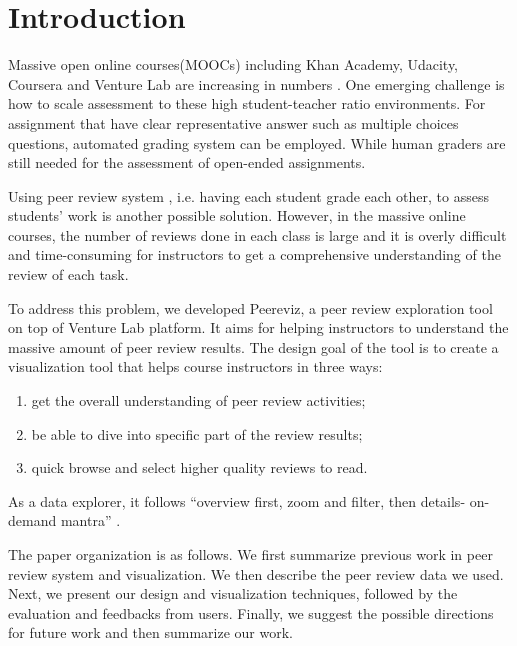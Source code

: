 \documentclass{sigchi}
\begin{document}
\section{Introduction}
Massive open online courses(MOOCs) including Khan Academy, Udacity, Coursera and
Venture Lab are increasing in numbers \cite{nytimes}. One emerging challenge is
how to scale assessment to these high student-teacher ratio environments.
For assignment that have clear representative answer
such as multiple choices questions,
automated grading system can be employed.
While human graders are still needed for the assessment of open-ended assignments.

Using peer review system \cite{cpr}, i.e. having each student grade each other,
to assess students’ work is another possible solution.
However, in the massive online courses, the number of reviews done in each class
is large and it is overly difficult
and time-consuming for instructors to get a comprehensive understanding
of the review of each task.

To address this problem, we developed Peereviz, a peer review exploration tool
on top of Venture Lab platform. It aims for helping instructors to understand
the massive amount of peer review results. The design goal of the tool is to
create a visualization tool that helps course instructors in three ways:

\begin{enumerate}
\item get the overall understanding of peer review activities;
\item be able to dive into specific part of the review results;
\item quick browse and select higher quality reviews to read.
\end{enumerate}

As a data explorer, it follows ``overview first, zoom and filter, then details-
on-demand mantra'' \cite{card1999readings}.


The paper organization is as follows.
We first summarize previous work in peer review system and visualization.
We then describe the peer review data we used.
Next, we present our design and visualization techniques,
followed by the evaluation and feedbacks from users.
Finally, we suggest the possible directions for future work
and then summarize our work.
\end{document}
